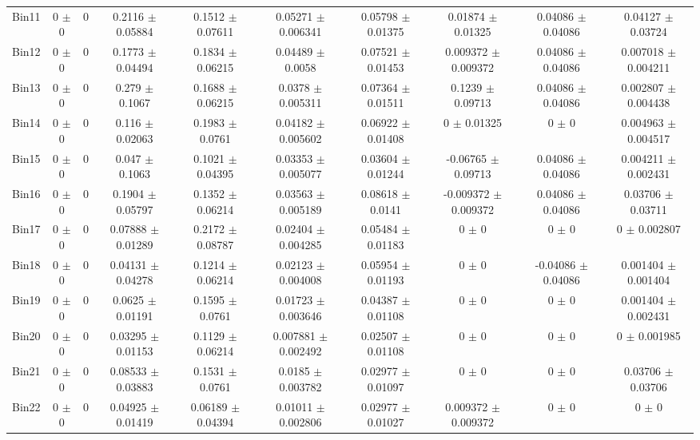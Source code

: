 \begin{tabular}{@{\extracolsep{4pt}}lccccccccc@{}}
     Bin11 & 0 $\pm$ 0 & 0 & 0.2116 $\pm$ 0.05884 & 0.1512 $\pm$ 0.07611 & 0.05271 $\pm$ 0.006341 & 0.05798 $\pm$ 0.01375 & 0.01874 $\pm$ 0.01325 & 0.04086 $\pm$ 0.04086 & 0.04127 $\pm$ 0.03724 \\ 
     Bin12 & 0 $\pm$ 0 & 0 & 0.1773 $\pm$ 0.04494 & 0.1834 $\pm$ 0.06215 & 0.04489 $\pm$ 0.0058 & 0.07521 $\pm$ 0.01453 & 0.009372 $\pm$ 0.009372 & 0.04086 $\pm$ 0.04086 & 0.007018 $\pm$ 0.004211 \\ 
     Bin13 & 0 $\pm$ 0 & 0 & 0.279 $\pm$ 0.1067 & 0.1688 $\pm$ 0.06215 & 0.0378 $\pm$ 0.005311 & 0.07364 $\pm$ 0.01511 & 0.1239 $\pm$ 0.09713 & 0.04086 $\pm$ 0.04086 & 0.002807 $\pm$ 0.004438 \\ 
     Bin14 & 0 $\pm$ 0 & 0 & 0.116 $\pm$ 0.02063 & 0.1983 $\pm$ 0.0761 & 0.04182 $\pm$ 0.005602 & 0.06922 $\pm$ 0.01408 & 0 $\pm$ 0.01325 & 0 $\pm$ 0 & 0.004963 $\pm$ 0.004517 \\ 
     Bin15 & 0 $\pm$ 0 & 0 & 0.047 $\pm$ 0.1063 & 0.1021 $\pm$ 0.04395 & 0.03353 $\pm$ 0.005077 & 0.03604 $\pm$ 0.01244 & -0.06765 $\pm$ 0.09713 & 0.04086 $\pm$ 0.04086 & 0.004211 $\pm$ 0.002431 \\ 
     Bin16 & 0 $\pm$ 0 & 0 & 0.1904 $\pm$ 0.05797 & 0.1352 $\pm$ 0.06214 & 0.03563 $\pm$ 0.005189 & 0.08618 $\pm$ 0.0141 & -0.009372 $\pm$ 0.009372 & 0.04086 $\pm$ 0.04086 & 0.03706 $\pm$ 0.03711 \\ 
     Bin17 & 0 $\pm$ 0 & 0 & 0.07888 $\pm$ 0.01289 & 0.2172 $\pm$ 0.08787 & 0.02404 $\pm$ 0.004285 & 0.05484 $\pm$ 0.01183 & 0 $\pm$ 0 & 0 $\pm$ 0 & 0 $\pm$ 0.002807 \\ 
     Bin18 & 0 $\pm$ 0 & 0 & 0.04131 $\pm$ 0.04278 & 0.1214 $\pm$ 0.06214 & 0.02123 $\pm$ 0.004008 & 0.05954 $\pm$ 0.01193 & 0 $\pm$ 0 & -0.04086 $\pm$ 0.04086 & 0.001404 $\pm$ 0.001404 \\ 
     Bin19 & 0 $\pm$ 0 & 0 & 0.0625 $\pm$ 0.01191 & 0.1595 $\pm$ 0.0761 & 0.01723 $\pm$ 0.003646 & 0.04387 $\pm$ 0.01108 & 0 $\pm$ 0 & 0 $\pm$ 0 & 0.001404 $\pm$ 0.002431 \\ 
     Bin20 & 0 $\pm$ 0 & 0 & 0.03295 $\pm$ 0.01153 & 0.1129 $\pm$ 0.06214 & 0.007881 $\pm$ 0.002492 & 0.02507 $\pm$ 0.01108 & 0 $\pm$ 0 & 0 $\pm$ 0 & 0 $\pm$ 0.001985 \\ 
     Bin21 & 0 $\pm$ 0 & 0 & 0.08533 $\pm$ 0.03883 & 0.1531 $\pm$ 0.0761 & 0.0185 $\pm$ 0.003782 & 0.02977 $\pm$ 0.01097 & 0 $\pm$ 0 & 0 $\pm$ 0 & 0.03706 $\pm$ 0.03706 \\ 
     Bin22 & 0 $\pm$ 0 & 0 & 0.04925 $\pm$ 0.01419 & 0.06189 $\pm$ 0.04394 & 0.01011 $\pm$ 0.002806 & 0.02977 $\pm$ 0.01027 & 0.009372 $\pm$ 0.009372 & 0 $\pm$ 0 & 0 $\pm$ 0 \\ 

\end{tabular}
